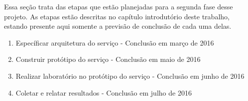 Essa seção trata das etapas que estão planejadas para a segunda fase desse projeto. As etapas estão descritas no capítulo introdutório deste trabalho, estando presente aqui somente a previsão de conclusão de cada uma delas.

\begin{enumerate}
	\item{Específicar arquitetura do serviço - Conclusão em março de 2016}
	\item{Construir protótipo do serviço - Conclusão em maio de 2016}
	\item{Realizar laboratório no protótipo do serviço - Conclusão em junho de 2016}
	\item{Coletar e relatar resultados - Conclusão em julho de 2016}
\end{enumerate}
